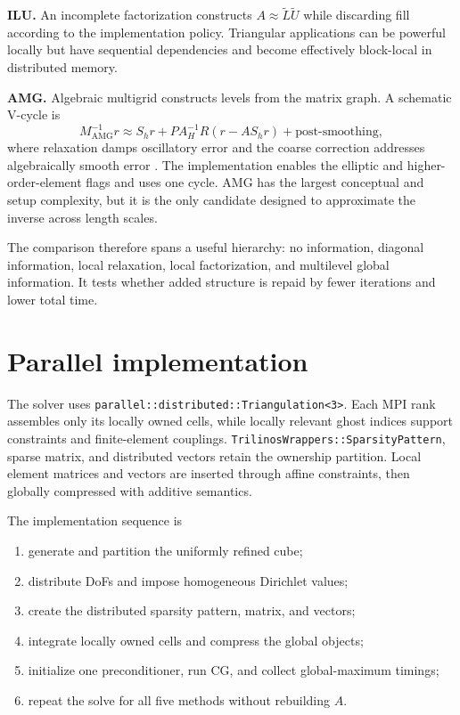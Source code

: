 \documentclass[10pt,a4paper]{article}
\begin{document}
\textbf{ILU.} An incomplete factorization constructs $A\approx\widetilde L\widetilde U$ while
discarding fill according to the implementation policy. Triangular applications can be powerful
locally but have sequential dependencies and become effectively block-local in distributed memory.

\textbf{AMG.} Algebraic multigrid constructs levels from the matrix graph. A schematic V-cycle is
\begin{equation}
 M_{\mathrm{AMG}}^{-1}r\approx S_h r
 +P A_H^{-1}R(r-AS_hr)+\text{post-smoothing},
\end{equation}
where relaxation damps oscillatory error and the coarse correction addresses algebraically smooth
error \cite{trottenberg2001}. The implementation enables the elliptic and higher-order-element
flags and uses one cycle. AMG has the largest conceptual and setup complexity, but it is the only
candidate designed to approximate the inverse across length scales.

The comparison therefore spans a useful hierarchy: no information, diagonal information, local
relaxation, local factorization, and multilevel global information. It tests whether added structure
is repaid by fewer iterations and lower total time.

\newpage
\section{Parallel implementation}
The solver uses \texttt{parallel::distributed::Triangulation<3>}. Each MPI rank assembles only its
locally owned cells, while locally relevant ghost indices support constraints and finite-element
couplings. \texttt{TrilinosWrappers::SparsityPattern}, sparse matrix, and distributed vectors retain
the ownership partition. Local element matrices and vectors are inserted through affine constraints,
then globally compressed with additive semantics.

The implementation sequence is
\begin{enumerate}
 \item generate and partition the uniformly refined cube;
 \item distribute DoFs and impose homogeneous Dirichlet values;
 \item create the distributed sparsity pattern, matrix, and vectors;
 \item integrate locally owned cells and compress the global objects;
 \item initialize one preconditioner, run CG, and collect global-maximum timings;
 \item repeat the solve for all five methods without rebuilding $A$.
\end{enumerate}
\end{document}

